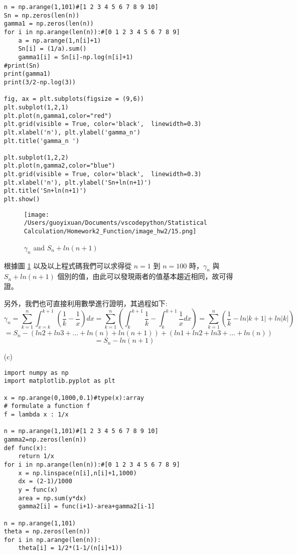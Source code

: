 \begin{itemize}
\begin{lstlisting}
n = np.arange(1,101)#[1 2 3 4 5 6 7 8 9 10]
Sn = np.zeros(len(n))
gamma1 = np.zeros(len(n))
for i in np.arange(len(n)):#[0 1 2 3 4 5 6 7 8 9]
    a = np.arange(1,n[i]+1)
    Sn[i] = (1/a).sum()
    gamma1[i] = Sn[i]-np.log(n[i]+1)
#print(Sn)
print(gamma1)
print(3/2-np.log(3))

fig, ax = plt.subplots(figsize = (9,6))
plt.subplot(1,2,1)
plt.plot(n,gamma1,color="red")
plt.grid(visible = True, color='black',  linewidth=0.3)
plt.xlabel('n'), plt.ylabel('gamma_n')
plt.title('gamma_n ')

plt.subplot(1,2,2)
plt.plot(n,gamma2,color="blue")
plt.grid(visible = True, color='black',  linewidth=0.3)
plt.xlabel('n'), plt.ylabel('Sn+ln(n+1)')
plt.title('Sn+ln(n+1)')
plt.show()

\end{lstlisting}

\begin{figure}[H]
    \centering
        \texttt{[image: /Users/guoyixuan/Documents/vscodepython/Statistical Calculation/Homework2\_Function/image\_hw2/15.png]}
    \caption{$\gamma_n$ and $S_n+ln(n+1)$}
    \label{fig:gamma_n}
\end{figure}

根據圖 \ref{fig:gamma_n} 以及以上程式碼我們可以求得從 $n=1$ 到 $n=100$ 時，$\gamma_n$ 與 $S_n+ln(n+1)$ 個別的值，由此可以發現兩者的值基本趨近相同，故可得證。

另外，我們也可直接利用數學進行證明，其過程如下:
$$\gamma_n=\sum_{k=1}^{n} \int_{x=k}^{k+1}(\frac{1}{k}-\frac{1}{x})dx 
=\sum_{k=1}^{n}(\int_{k}^{k+1}\frac{1}{k}-\int_{k}^{k+1}\frac{1}{x} dx)=\sum_{k=1}^{n}(\frac{1}{k}-ln \left| k+1 \right|+ln \left| k \right|)$$
$$=S_n-(ln2+ln3+...+ln(n)+ln(n+1))+(ln1+ln2+ln3+...+ln(n))$$
$$=S_n-ln(n+1)$$

\item[(c)]
\bigskip
\begin{lstlisting}
import numpy as np
import matplotlib.pyplot as plt

x = np.arange(0,1000,0.1)#type(x):array
# formulate a function f
f = lambda x : 1/x

n = np.arange(1,101)#[1 2 3 4 5 6 7 8 9 10]
gamma2=np.zeros(len(n))
def func(x):
    return 1/x
for i in np.arange(len(n)):#[0 1 2 3 4 5 6 7 8 9]
    x = np.linspace(n[i],n[i]+1,1000)
    dx = (2-1)/1000
    y = func(x)
    area = np.sum(y*dx)
    gamma2[i] = func(i+1)-area+gamma2[i-1]

n = np.arange(1,101)
theta = np.zeros(len(n))
for i in np.arange(len(n)):
    theta[i] = 1/2*(1-1/(n[i]+1))



\end{lstlisting}
\end{itemize}
